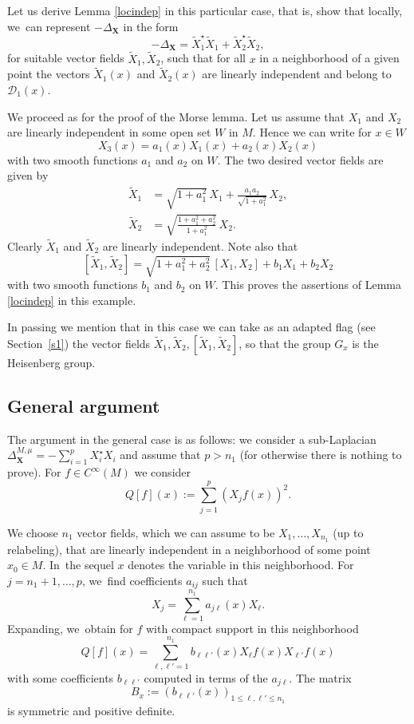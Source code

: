 \documentclass[10pt]{amsart}
\newcommand{\bX}{{\boldsymbol{X}}}
\theoremstyle{definition}
\let\Xb\bX
\newcommand{\1}{\mathbbm{1}}
\begin{document}
Let us derive Lemma \ref{locindep} in this particular case, that is, show that locally, we~can represent $-\Delta_\Xb$ in the form
\[
- \Delta_\Xb = \tilde X_1^\star \tilde X_1 + \tilde X_2^\star \tilde X_2,
\]
for suitable vector fields $\tilde X_1,\tilde X_2$, such that for all $x$ in a neighborhood of a given point the vectors $\tilde X_1(x)$ and $\tilde X_2(x)$ are linearly independent and belong to $\mathcal D_1(x)$.

We proceed as for the proof of the Morse lemma. Let us assume that $X_1$ and $X_2$ are linearly independent in some open set $W$ in $M$. Hence we can write for $x\in W$
\[
X_3(x) = a_1(x) X_1(x) + a_2(x) X_2(x)
\]
with two smooth functions $a_1$ and $a_2$ on $W$. The two desired vector fields are given by
\begin{equation}
\begin{array}{ll}
\tilde X_1 &= \sqrt{1+a_1^2} \,X_1 + \frac{a_1 a_2}{\sqrt{1+ a_1^2}} \,X_2, \\
\tilde X_2 &= \sqrt{\frac{1+ a_1^2 + a_2^2}{1+a_1^2}} \,X_2.
\end{array}
\end{equation}
Clearly $\tilde X_1$ and $\tilde X_2$ are linearly independent. Note also that
\[
[\tilde X_1,\tilde X_2] = \sqrt{1+a_1^2 +a_2^2}\,[X_1,X_2] + b_1 X_1 + b_2 X_2
\]
with two smooth functions $b_1$ and $b_2$ on $W$. This proves the assertions of Lemma \ref{locindep} in this example.

In passing we mention that in this case we can take as an adapted flag (see Section~\ref{s1}) the vector fields $\tilde X_1, \tilde X_2, [\tilde X_1,\tilde X_2] $, so that the group $G_x$ is the Heisenberg group.

\subsection{General argument}
The argument in the general case is as follows: we consider a sub-Laplacian $\Delta_\Xb^{M,\mu} =-\sum_{i=1}^p X_i^\star X_i$ and assume that $p>n_1$ (for otherwise there is nothing to prove). For $f\in C^\infty(M)$ we consider
\[
Q[f](x) := \sum_{j=1}^p (X_j f (x))^2.
\]

We choose $n_1$ vector fields, which we can assume to be $X_1,\ldots,X_{n_1}$ (up to relabeling), that are linearly independent in a neighborhood of some point $x_0\in M$. In~the sequel $x$ denotes the variable in this neighborhood. For $j=n_1+1,\ldots,p$, we~find coefficients $a_{ij}$ such that
\[
X_j=\sum_{\ell=1}^{n_1} a_{j\ell}(x)X_\ell.
\]
Expanding, we~obtain for $f$ with compact support in this neighborhood
\[
Q[f](x)=\sum_{\ell, \ell'=1}^{n_1} b_{\ell \ell'}(x)X_\ell f(x) X_{\ell'}f(x)
\]
with some coefficients $b_{\ell \ell'}$ computed in terms of the $a_{j\ell}$. The matrix
\[
B_x :=(b_{\ell \ell'}(x))_{1\leq \ell,\ell'\leq n_1}
\]
is symmetric and positive definite.
\end{document}
